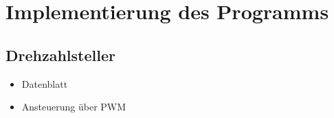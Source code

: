 \clearpage
\chapter{\textbf{Implementierung des Programms}}\label{kap4}

\section{Drehzahlsteller}
\begin{itemize}
	\item Datenblatt
	\item Ansteuerung über PWM 
\end{itemize}


